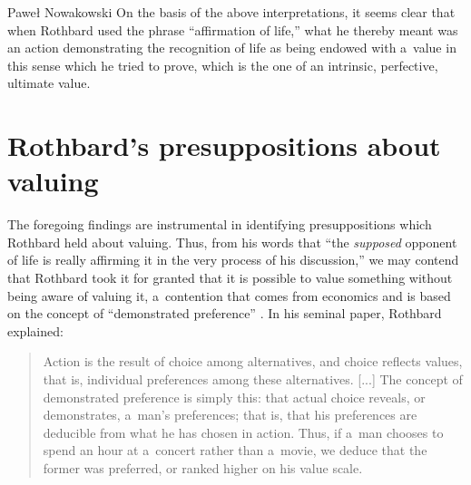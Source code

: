 \begin{artengenv}{Paweł Nowakowski}
On the basis of the above interpretations, it seems clear that when Rothbard used the phrase ``affirmation of life,'' what he thereby meant was an action demonstrating the recognition of life as being endowed with a~value in this sense which he tried to prove, which is the one of an intrinsic, perfective, ultimate value.



\section{Rothbard's presuppositions about valuing}

The foregoing findings are instrumental in identifying presuppositions which Rothbard held about valuing. Thus, from his words that ``the \textit{supposed} opponent of life is really affirming it in the very process of his discussion,'' we may contend that Rothbard took it for granted that it is possible to value something without being aware of valuing it, a~contention that comes from economics and is based on the concept of ``demonstrated preference'' 
\parencite[cf.][p.61]{Osterfeld1986Freedom}. %
 In his seminal paper, Rothbard 
\parencite*[][p.289]{Rothbard2011Economic} %
 explained:



\begin{quote}
Action is the result of choice among alternatives, and choice reflects values, that is, individual preferences among these alternatives. [...] The concept of demonstrated preference is simply this: that actual choice reveals, or demonstrates, a~man's preferences; that is, that his preferences are deducible from what he has chosen in action. Thus, if a~man chooses to spend an hour at a~concert rather than a~movie, we deduce that the former was preferred, or ranked higher on his value scale.
\end{quote}




\end{artengenv}
